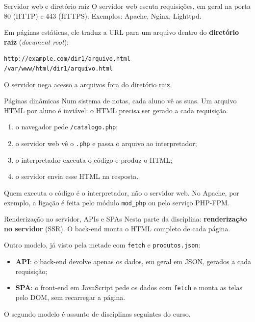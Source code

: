 \documentclass{beamer}
\begin{document}
\begin{frame}{Servidor web e diretório raiz}
	O servidor web escuta requisições, em geral na porta 80 (HTTP) e 443 (HTTPS).
	Exemplos: Apache, Nginx, Lighttpd.

	\vspace{0.3cm}
	Em páginas estáticas, ele traduz a URL para um arquivo dentro do
	\textbf{diretório raiz} (\emph{document root}):

	\vspace{0.2cm}
	\begin{center}
		\small
		\texttt{http://example.com/dir1/arquivo.html}\\[0.1cm]
		\texttt{/var/www/html/dir1/arquivo.html}
	\end{center}

	\vspace{0.2cm}
	O servidor nega acesso a arquivos fora do diretório raiz.
\end{frame}

\begin{frame}{Páginas dinâmicas}
	Num sistema de notas, cada aluno vê as suas. Um arquivo HTML por aluno é
	inviável: o HTML precisa ser gerado a cada requisição.

	\vspace{0.3cm}
	\begin{enumerate}
		\item o navegador pede \texttt{/catalogo.php};
		\item o servidor web vê o \texttt{.php} e passa o arquivo ao interpretador;
		\item o interpretador executa o código e produz o HTML;
		\item o servidor envia esse HTML na resposta.
	\end{enumerate}

	\vspace{0.3cm}
	Quem executa o código é o interpretador, não o servidor web. No Apache, por
	exemplo, a ligação é feita pelo módulo \texttt{mod\_php} ou pelo serviço
	PHP-FPM.
\end{frame}

\begin{frame}{Renderização no servidor, APIs e SPAs}
	Nesta parte da disciplina: \textbf{renderização no servidor} (SSR). O
	back-end monta o HTML completo de cada página.

	\vspace{0.3cm}
	Outro modelo, já visto pela metade com \texttt{fetch} e
	\texttt{produtos.json}:
	\begin{itemize}
		\item \textbf{API}: o back-end devolve apenas os dados, em geral em JSON,
		      gerados a cada requisição;
		\item \textbf{SPA}: o front-end em JavaScript pede os dados com
		      \texttt{fetch} e monta as telas pelo DOM, sem recarregar a página.
	\end{itemize}

	\vspace{0.3cm}
	O segundo modelo é assunto de disciplinas seguintes do curso.
\end{frame}
\end{document}
